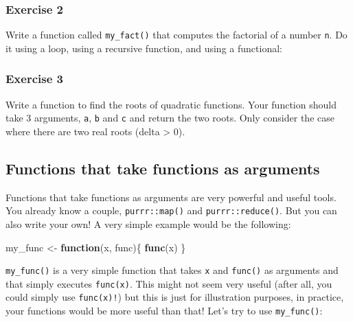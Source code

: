 \documentclass[]{gitbook}
\newenvironment{Shaded}{\begin{snugshade}}{\end{snugshade}}
\newcommand{\ControlFlowTok}[1]{\textcolor[rgb]{0.13,0.29,0.53}{\textbf{#1}}}
\newcommand{\KeywordTok}[1]{\textcolor[rgb]{0.13,0.29,0.53}{\textbf{#1}}}
\newcommand{\NormalTok}[1]{#1}
\newcommand{\StringTok}[1]{\textcolor[rgb]{0.31,0.60,0.02}{#1}}
\theoremstyle{definition}
\theoremstyle{definition}
\theoremstyle{definition}
\theoremstyle{remark}
\begin{document}
\hypertarget{exercise-2-2}{%
\subsubsection*{Exercise 2}\label{exercise-2-2}}

Write a function called \texttt{my\_fact()} that computes the factorial
of a number \texttt{n}. Do it using a loop, using a recursive function,
and using a functional:

\hypertarget{exercise-3-2}{%
\subsubsection*{Exercise 3}\label{exercise-3-2}}

Write a function to find the roots of quadratic functions. Your function
should take 3 arguments, \texttt{a}, \texttt{b} and \texttt{c} and
return the two roots. Only consider the case where there are two real
roots (delta \textgreater{} 0).

\hypertarget{functions-that-take-functions-as-arguments}{%
\subsection{Functions that take functions as
arguments}\label{functions-that-take-functions-as-arguments}}

Functions that take functions as arguments are very powerful and useful
tools. You already know a couple, \texttt{purrr::map()} and
\texttt{purrr::reduce()}. But you can also write your own! A very simple
example would be the following:

\begin{Shaded}
\begin{Highlighting}[]
\NormalTok{my_func <-}\StringTok{ }\ControlFlowTok{function}\NormalTok{(x, func)\{}
  \KeywordTok{func}\NormalTok{(x)}
\NormalTok{\}}
\end{Highlighting}
\end{Shaded}

\texttt{my\_func()} is a very simple function that takes \texttt{x} and
\texttt{func()} as arguments and that simply executes \texttt{func(x)}.
This might not seem very useful (after all, you could simply use
\texttt{func(x)!}) but this is just for illustration purposes, in
practice, your functions would be more useful than that! Let's try to
use \texttt{my\_func()}:
\end{document}

